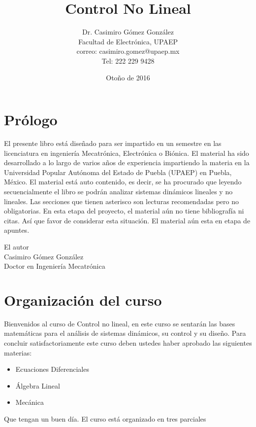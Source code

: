\documentclass[12pt]{book}
\title{Control No Lineal}
\author{Dr. Casimiro Gómez González\\
	Facultad de Electrónica, UPAEP\\
               correo: casimiro.gomez@upaep.mx\\
               Tel: 222 229 9428}
\date{Otoño de 2016}
\theoremstyle{definition}
\theoremstyle{remark}
\theoremstyle{plain}
\begin{document}
\frontmatter
\maketitle


\chapter{Prólogo}

El presente libro está diseñado para ser impartido en un semestre en las licenciatura en ingeniería Mecatrónica, Electrónica o Biónica. 
El material ha sido desarrollado a lo largo de varios años de experiencia impartiendo la materia en la Universidad Popular Autónoma del 
Estado de Puebla (UPAEP) en Puebla, México. El material está auto contenido, es decir, se ha procurado que leyendo secuencialmente el 
libro se podrán analizar sistemas dinámicos lineales y no lineales. Las secciones que tienen asterisco son lecturas recomendadas pero no 
obligatorias. En esta etapa del proyecto, el material aún no tiene bibliografía ni citas. Así que favor de considerar esta situación. El 
material aún esta en etapa de apuntes.


\begin{flushright}

El autor\\
Casimiro Gómez González\\
Doctor en Ingeniería Mecatrónica
\end{flushright}

\tableofcontents

\mainmatter

\chapter{Organización del curso}
Bienvenidos al curso de Control no lineal, en este curso se sentarán las bases matemáticas para el análisis de sistemas dinámicos, 
su control y su diseño. Para concluir satisfactoriamente este curso deben ustedes haber aprobado las siguientes materias:

\begin{itemize}
 \item Ecuaciones Diferenciales
 \item Álgebra Lineal
 \item Mecánica
\end{itemize}

Que tengan un buen día. El curso está organizado en tres parciales
\end{document}
